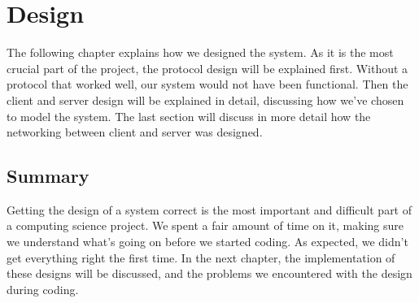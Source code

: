 \chapter{Design}
\label{design}

The following chapter explains how we designed the system. As it is the most crucial part of the project, the protocol design will be explained first. Without a protocol that worked well, our system would not have been functional. Then the client and server design will be explained in detail, discussing how we've chosen to model the system. The last section will discuss in more detail how the networking between client and server was designed.









\section{Summary}
Getting the design of a system correct is the most important and difficult part of a computing science project. We spent a fair amount of time on it, making sure we understand what's going on before we started coding. As expected, we didn't get everything right the first time. In the next chapter, the implementation of these designs will be discussed, and the problems we encountered with the design during coding.
